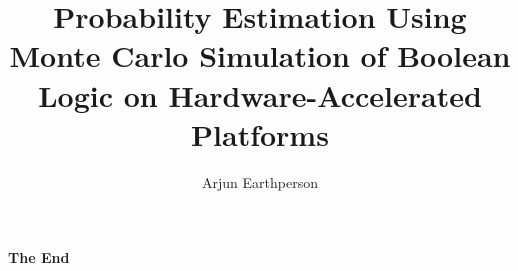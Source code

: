\documentclass[aspectratio=169,xcolor=dvipsnames]{beamer}
\title{Probability Estimation Using Monte Carlo Simulation of Boolean Logic on Hardware-Accelerated Platforms}
\author{Arjun Earthperson}
\institute
{
    PhD Candidate, PRA Group\\
}
\begin{document}
\begin{frame}
    \titlepage
\end{frame}








% 
% 
% 
% 
% 
% 

%     
%     


\begin{frame}
    \Huge{\centerline{\textbf{The End}}}
\end{frame}



\end{document}
